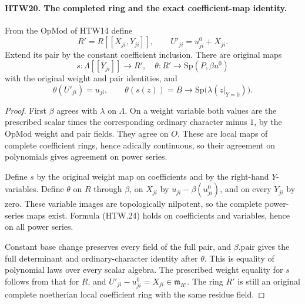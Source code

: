 \paragraph{HTW20. The completed ring and the exact coefficient-map identity.}
\label{claim:HTW20}
From the \(\mathrm{OpMod}\) of HTW14 define
\[
 R'=R[[X_{ji},Y_{ji}]],\qquad U'_{ji}=u^0_{ji}+X_{ji}.
 \tag{HTW.23}
\]
Extend its pair by the constant coefficient inclusion.
There are original maps
\[
 s:\Lambda[[Y_{ji}]]\longrightarrow R',
 \quad
 \theta:R'\longrightarrow\mathrm{Sp}(P,\beta u^0)
\]
with the original weight and pair identities, and
\[
 \theta(U'_{ji})=u_{ji},\qquad
 \theta(s(z))=
       B\longrightarrow\mathrm{Sp}\bigl(\lambda(z|_{Y=0})\bigr).
 \tag{HTW.24}
\]
\begin{proof}
First \(\beta\) agrees with \(\lambda\) on
\(\Lambda\).  On a weight variable both values are
the prescribed scalar times the corresponding
ordinary character minus \(1\), by the
\(\mathrm{OpMod}\) weight and pair fields.
They agree on \(O\).  These are local maps of
complete coefficient rings, hence adically
continuous, so their agreement on polynomials
gives agreement on power series.

Define \(s\) by the original weight map on
coefficients and by the right-hand \(Y\)-variables.
Define \(\theta\) on \(R\) through \(\beta\),
on \(X_{ji}\) by \(u_{ji}-\beta(u^0_{ji})\),
and on every \(Y_{ji}\) by zero.  These variable
images are topologically nilpotent, so the
complete power-series maps exist.  Formula
(HTW.24) holds on coefficients and variables,
hence on all power series.

Constant base change preserves every field of
the full pair, and \(\beta.\mathrm{pair}\) gives
the full determinant and ordinary-character
identity after \(\theta\).  This is equality of
polynomial laws over every scalar algebra.
The prescribed weight equality for \(s\) follows
from that for \(R\), and
\(U'_{ji}-u^0_{ji}=X_{ji}\in\mathfrak m_{R'}\).
The ring \(R'\) is still an original complete
noetherian local coefficient ring with the same
residue field.
\end{proof}

